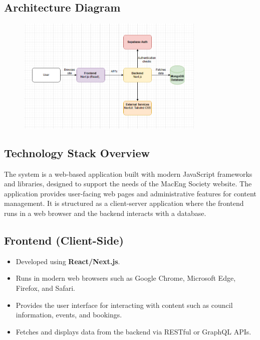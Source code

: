 \documentclass[12pt]{article}
\begin{document}
  \subsection{Architecture Diagram}
    \begin{figure}[H]
        \centering
        \includegraphics[width=0.8\textwidth]{architecture_diagram_Justin.png}
        \label{fig:architecture_diagram}
    \end{figure}

  \subsection{Technology Stack Overview}
    The system is a web-based application built with modern JavaScript frameworks and libraries, designed to support the needs of the MacEng Society website. The application provides user-facing web pages and administrative features for content management. It is structured as a client-server application where the frontend runs in a web browser and the backend interacts with a database.
    \subsection{Frontend (Client-Side)}
    \begin{itemize}
        \item Developed using \textbf{React/Next.js}.
        \item Runs in modern web browsers such as Google Chrome, Microsoft Edge, Firefox, and Safari.
        \item Provides the user interface for interacting with content such as council information, events, and bookings.
        \item Fetches and displays data from the backend via RESTful or GraphQL APIs.
    \end{itemize}
\end{document}
